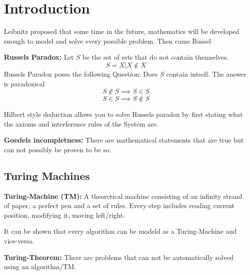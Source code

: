\section{Introduction}

Leibnitz proposed that some time in the future, mathematics will be developed enough to model and solve every possible problem. Then came Russel

\begin{definition}
    \textbf{Russels Paradox:} Let $S$ be the set of sets that do not contain themselves.
    $$S = { X | X \notin X}$$
    Russels Paradox poses the following Question: Does $S$ contain intself. The answer is paradoxical
    $$S \notin S \implies S \in S$$
    $$S \in S \implies S \notin S$$
\end{definition}

\begin{remark}
    Hilbert style deduction allows you to solve Russels paradox by first stating what the axioms and interference rules of the System are.
\end{remark}

\begin{theorem}
    \textbf{Goedels incompletness:} There are mathematical statements that are true but can not possibly be proven to be so.
\end{theorem}

\subsection{Turing Machines}

\begin{definition}
    \textbf{Turing-Machine (TM):} A theoretical machine consisting of an infinity strand of paper, a perfect pen and a set of rules. Every step includes reading current position, modifying it, moving left/right.
\end{definition}

\begin{remark}
    It can be shown that every algorithm can be modeld as a Turing-Machine and vice-versa.
\end{remark}

\begin{theorem}
    \textbf{Turing-Theorem:} There are problems that can not be automatically solved using an algorithm/TM.
\end{theorem}


